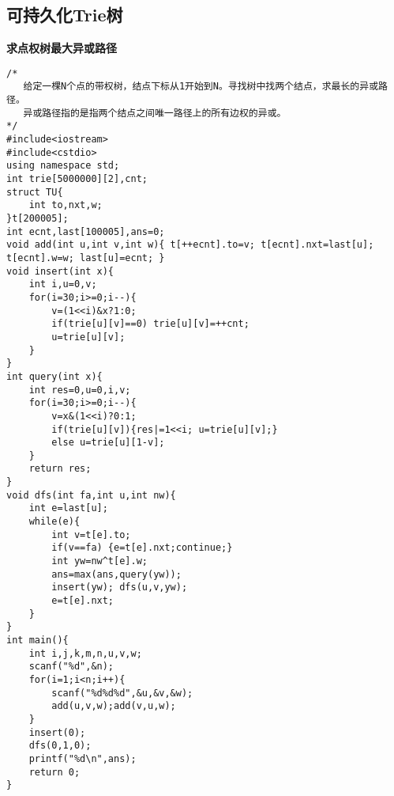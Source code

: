 \subsection{可持久化Trie树}
\textbf{求点权树最大异或路径}
\begin{lstlisting}
/*
   给定一棵N个点的带权树，结点下标从1开始到N。寻找树中找两个结点，求最长的异或路径。
   异或路径指的是指两个结点之间唯一路径上的所有边权的异或。
*/
#include<iostream>
#include<cstdio>
using namespace std;
int trie[5000000][2],cnt;
struct TU{
	int to,nxt,w;
}t[200005];
int ecnt,last[100005],ans=0;
void add(int u,int v,int w){ t[++ecnt].to=v; t[ecnt].nxt=last[u]; t[ecnt].w=w; last[u]=ecnt; }
void insert(int x){
	int i,u=0,v;
	for(i=30;i>=0;i--){
		v=(1<<i)&x?1:0;
		if(trie[u][v]==0) trie[u][v]=++cnt;
		u=trie[u][v];
	}
}
int query(int x){
	int res=0,u=0,i,v;
	for(i=30;i>=0;i--){
		v=x&(1<<i)?0:1;
		if(trie[u][v]){res|=1<<i; u=trie[u][v];}
		else u=trie[u][1-v];
	}
	return res;
}
void dfs(int fa,int u,int nw){
	int e=last[u];
	while(e){
		int v=t[e].to;
		if(v==fa) {e=t[e].nxt;continue;}
		int yw=nw^t[e].w;
		ans=max(ans,query(yw));
		insert(yw); dfs(u,v,yw);
		e=t[e].nxt;
	}
}
int main(){
	int i,j,k,m,n,u,v,w;
	scanf("%d",&n);
	for(i=1;i<n;i++){
		scanf("%d%d%d",&u,&v,&w);
		add(u,v,w);add(v,u,w);
	}
	insert(0);
	dfs(0,1,0);
	printf("%d\n",ans);
	return 0;
}
\end{lstlisting}

